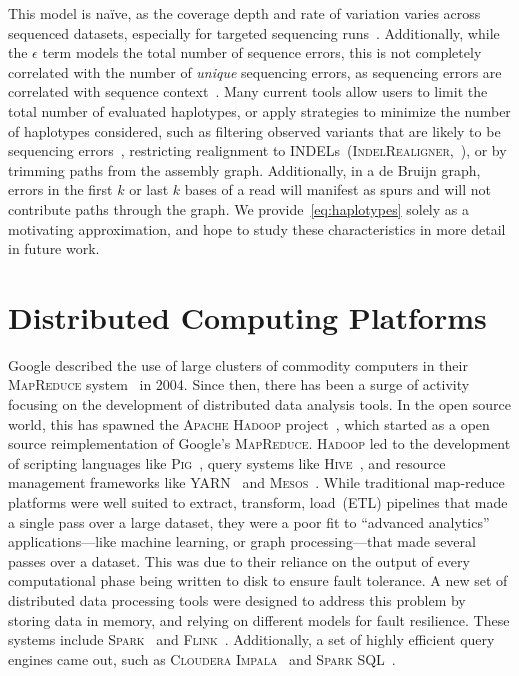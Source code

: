 \documentclass[phd]{ucbthesis}
\begin{document}
This model is na\"{i}ve, as the coverage depth and rate of variation varies across sequenced datasets,
especially for targeted sequencing runs~\cite{fang14}. Additionally, while the $\epsilon$ term models the
total number of sequence errors, this is not completely correlated with the number of \emph{unique}
sequencing errors, as sequencing errors are correlated with sequence context~\cite{depristo11}. Many
current tools allow users to limit the total number of evaluated haplotypes, or apply strategies to minimize
the number of haplotypes considered, such as filtering observed variants that are likely to be sequencing
errors~\cite{garrison12}, restricting realignment to INDELs~(\textsc{IndelRealigner},~\cite{depristo11}), or
by trimming paths from the assembly graph. Additionally, in a de Bruijn graph, errors in the
first $k$ or last $k$ bases of a read will manifest as spurs and will not contribute paths through the graph. We provide~\eqref{eq:haplotypes} solely as a motivating
approximation, and hope to study these characteristics in more detail in future work.

\section{Distributed Computing Platforms}
\label{sec:distributed-computing}

Google described the use of large clusters of commodity computers in their
\textsc{MapReduce} system~\cite{dean04, dean08} in 2004. Since then, there has
been a surge of activity focusing on the development of distributed data
analysis tools. In the open source world, this has spawned the \textsc{Apache
  Hadoop} project~\cite{hadoop}, which started as a open source reimplementation
of Google's \textsc{MapReduce}. \textsc{Hadoop} led to the development of
scripting languages like \textsc{Pig}~\cite{olston08}, query systems like
\textsc{Hive}~\cite{thusoo09}, and resource management frameworks like
\textsc{YARN}~\cite{vavilapalli13} and \textsc{Mesos}~\cite{hindman11}. While
traditional map-reduce platforms were well suited to extract, transform,
load~(ETL) pipelines that made a single pass over a large dataset, they were
a poor fit to ``advanced analytics'' applications---like machine learning, or
graph processing---that made several passes over a dataset. This was due to
their reliance on the output of every computational phase being written to
disk to ensure fault tolerance. A new set of distributed data processing tools
were designed to address this problem by storing data in memory, and relying
on different models for fault resilience. These systems include
\textsc{Spark}~\cite{zaharia10, zaharia12} and \textsc{Flink}~\cite{carbone15}.
Additionally, a set of highly efficient query engines came out, such as
\textsc{Cloudera Impala}~\cite{kornacker15} and \textsc{Spark
  SQL}~\cite{armbrust15}.
\end{document}
